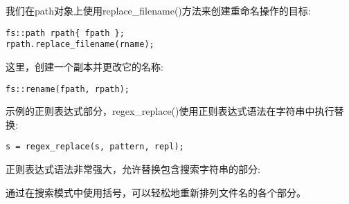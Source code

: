 我们在path对象上使用replace\_filename()方法来创建重命名操作的目标:

\begin{lstlisting}[style=styleCXX]
fs::path rpath{ fpath };
rpath.replace_filename(rname);
\end{lstlisting}

这里，创建一个副本并更改它的名称:

\begin{lstlisting}[style=styleCXX]
fs::rename(fpath, rpath);
\end{lstlisting}

示例的正则表达式部分，regex\_replace()使用正则表达式语法在字符串中执行替换:

\begin{lstlisting}[style=styleCXX]
s = regex_replace(s, pattern, repl);
\end{lstlisting}

正则表达式语法非常强大，允许替换包含搜索字符串的部分:


通过在搜索模式中使用括号，可以轻松地重新排列文件名的各个部分。



